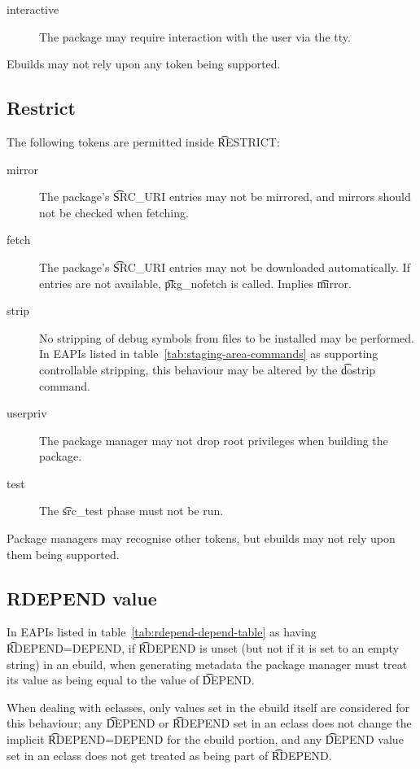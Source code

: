 \begin{description}
\item[interactive] The package may require interaction with the user via the tty.
\end{description}

Ebuilds may not rely upon any token being supported.

\subsection{Restrict}
\label{sec:restrict}

The following tokens are permitted inside \t{RESTRICT}:

\begin{description}
\item[mirror] The package's \t{SRC_URI} entries may not be mirrored, and mirrors should not be
    checked when fetching.
\item[fetch] The package's \t{SRC_URI} entries may not be downloaded automatically. If entries are
    not available, \t{pkg_nofetch} is called. Implies \t{mirror}.
\item[strip] No stripping of debug symbols from files to be installed may be performed. In EAPIs
    listed in table~\ref{tab:staging-area-commands} as supporting controllable stripping, this
    behaviour may be altered by the \t{dostrip} command.
\item[userpriv] The package manager may not drop root privileges when building the package.
\item[test] The \t{src_test} phase must not be run.
\end{description}

Package managers may recognise other tokens, but ebuilds may not rely upon them being supported.

\subsection{RDEPEND value}
\label{sec:rdepend-depend}

 In EAPIs listed in table~\ref{tab:rdepend-depend-table} as having
\t{RDEPEND=DEPEND}, if \t{RDEPEND} is unset (but not if it is set to an empty string) in an ebuild,
when generating metadata the package manager must treat its value as being equal to the value of
\t{DEPEND}.

When dealing with eclasses, only values set in the ebuild itself are considered for this behaviour;
any \t{DEPEND} or \t{RDEPEND} set in an eclass does not change the implicit \t{RDEPEND=DEPEND} for
the ebuild portion, and any \t{DEPEND} value set in an eclass does not get treated as being part of
\t{RDEPEND}.

